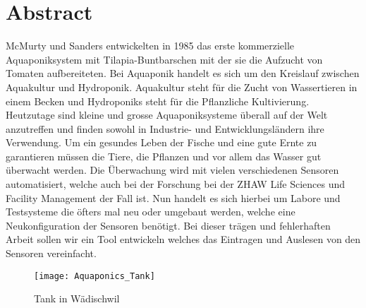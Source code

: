 \documentclass[../main.tex]{subfiles}
\begin{document}
	
		
	\section*{Abstract}
	McMurty und Sanders entwickelten in 1985 das erste kommerzielle Aquaponiksystem mit Tilapia-Buntbarschen mit der sie die Aufzucht von Tomaten aufbereiteten. Bei Aquaponik handelt es sich um den Kreislauf zwischen Aquakultur und Hydroponik. Aquakultur steht für die Zucht von Wassertieren in einem Becken und Hydroponiks steht für die Pflanzliche Kultivierung. Heutzutage sind kleine und grosse Aquaponiksysteme überall auf der Welt anzutreffen und finden sowohl in Industrie- und Entwicklungsländern ihre Verwendung. Um ein gesundes Leben der Fische und eine gute Ernte zu garantieren müssen die Tiere, die Pflanzen und vor allem das Wasser gut überwacht werden. Die Überwachung wird mit vielen verschiedenen Sensoren automatisiert, welche auch bei der Forschung bei der ZHAW Life Sciences und Facility Management der Fall ist. Nun handelt es sich hierbei um Labore und Testsysteme die öfters mal neu oder umgebaut werden, welche eine Neukonfiguration der Sensoren benötigt. Bei dieser trägen und fehlerhaften Arbeit sollen wir ein Tool entwickeln welches das Eintragen und Auslesen von den Sensoren vereinfacht.\\
	
	\begin{figure}[H]
		\centering
		\texttt{[image: Aquaponics\_Tank]}
		\caption{Tank in Wädischwil}
		\label{fig:Aquaponics_Tank}
	\end{figure}
	\par \noindent
	
\end{document}
